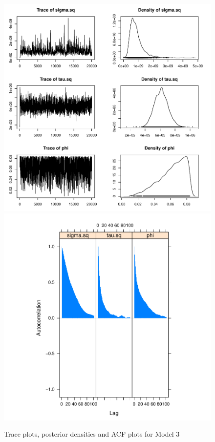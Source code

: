 \documentclass[12pt]{article}
\begin{document}
	\begin{figure}[H]
		\centering
		\includegraphics[scale=0.55]{Plots_North+South/v3_both.pdf}
		\includegraphics[scale=0.55]{Plots_North+South/v3_both_acf.pdf}
		\caption{Trace plots, posterior densities and ACF plots for Model 3}
	\end{figure}
	
\end{document}

